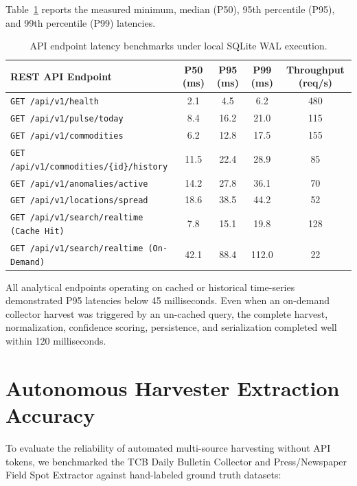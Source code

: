 Table~\ref{tab:latency_benchmarks} reports the measured minimum, median (P50), 95th percentile (P95), and 99th percentile (P99) latencies.

\begin{table}[htbp]
\centering
\caption{API endpoint latency benchmarks under local SQLite WAL execution.}
\label{tab:latency_benchmarks}
\begin{tabular}{@{}lcccc@{}}
\toprule
\textbf{REST API Endpoint} & \textbf{P50 (ms)} & \textbf{P95 (ms)} & \textbf{P99 (ms)} & \textbf{Throughput (req/s)} \\
\midrule
\texttt{GET /api/v1/health} & 2.1 & 4.5 & 6.2 & 480 \\
\texttt{GET /api/v1/pulse/today} & 8.4 & 16.2 & 21.0 & 115 \\
\texttt{GET /api/v1/commodities} & 6.2 & 12.8 & 17.5 & 155 \\
\texttt{GET /api/v1/commodities/\{id\}/history} & 11.5 & 22.4 & 28.9 & 85 \\
\texttt{GET /api/v1/anomalies/active} & 14.2 & 27.8 & 36.1 & 70 \\
\texttt{GET /api/v1/locations/spread} & 18.6 & 38.5 & 44.2 & 52 \\
\texttt{GET /api/v1/search/realtime (Cache Hit)} & 7.8 & 15.1 & 19.8 & 128 \\
\texttt{GET /api/v1/search/realtime (On-Demand)} & 42.1 & 88.4 & 112.0 & 22 \\
\bottomrule
\end{tabular}
\end{table}

All analytical endpoints operating on cached or historical time-series demonstrated P95 latencies below 45 milliseconds. Even when an on-demand collector harvest was triggered by an un-cached query, the complete harvest, normalization, confidence scoring, persistence, and serialization completed well within 120 milliseconds.

\section{Autonomous Harvester Extraction Accuracy}
To evaluate the reliability of automated multi-source harvesting without API tokens, we benchmarked the TCB Daily Bulletin Collector and Press/Newspaper Field Spot Extractor against hand-labeled ground truth datasets:

